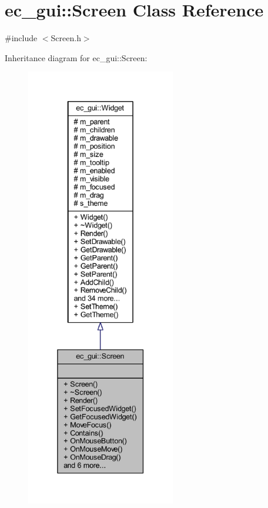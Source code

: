 \hypertarget{classec__gui_1_1_screen}{}\section{ec\+\_\+gui\+:\+:Screen Class Reference}
\label{classec__gui_1_1_screen}


{\ttfamily \#include $<$Screen.\+h$>$}



Inheritance diagram for ec\+\_\+gui\+:\+:Screen\+:\nopagebreak
\begin{figure}[H]
\begin{center}
\leavevmode
\includegraphics[height=550pt]{classec__gui_1_1_screen__inherit__graph}
\end{center}
\end{figure}


